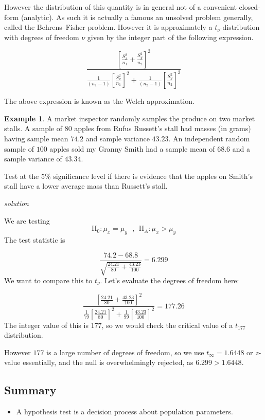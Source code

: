 \documentclass[
]{book}
\providecommand{\tightlist}{%
  \setlength{\itemsep}{0pt}\setlength{\parskip}{0pt}}
\theoremstyle{definition}
\theoremstyle{definition}
\newtheorem{example}{Example}[chapter]
\theoremstyle{definition}
\theoremstyle{definition}
\theoremstyle{remark}
\begin{document}
However the distribution of this quantity is in general not of a convenient closed-form (analytic). As such it is actually a famous an unsolved problem generally, called the Behrens--Fisher problem. However it is approximately a \(t_\nu\)-distribution with degrees of freedom \(\nu\) given by the integer part of the following expression.

\[\frac{\left[\frac{S^2_x}{n_1}+\frac{S^2_y}{n_2} \right]^2}{\frac{1}{(n_1-1)}\left[\frac{S_x^2}{n_1}\right]^2+\frac{1}{(n_2-1)}\left[\frac{S_y^2}{n_2}\right]^2} \]

The above expression is known as the Welch approximation.

\begin{example}
A market inspector randomly samples the produce on two market stalls. A sample of \(80\) apples from Rufus Russett's stall had masses (in grams) having sample mean \(74.2\) and sample variance \(43.23\).
An independent random sample of \(100\) apples sold my Granny Smith had a sample mean of \(68.6\) and a sample variance of \(43.34\).

Test at the \(5\%\) significance level if there is evidence that the apples on Smith's stall have a lower average mass than Russett's stall.
\end{example}

\emph{solution}

We are testing
\[\text{H}_0: \mu_x = \mu_y \ \ \ , \ \ \text{H}_A:\mu_x>\mu_y\]
The test statistic is

\[ \frac{74.2 - 68.8}{\sqrt{\frac{24.21}{80}+\frac{43.23}{100}}} = 6.299\]
We want to compare this to \(t_\nu\). Let's evaluate the degrees of freedom here:

\[\frac{\left[\frac{24.21}{80}+\frac{43.23}{100} \right]^2}{\frac{1}{79}\left[\frac{24.21}{80}\right]^2+\frac{1}{99}\left[\frac{43.23}{100}\right]^2} = 177.26 \]
The integer value of this is \(177\), so we would check the critical value of a \(t_177\) distribution.

However \(177\) is a large number of degrees of freedom, so we use \(t_{\infty}=1.6448\) or \(z\)-value essentially, and the null is overwhelmingly rejected, as \(6.299 >1.6448\).

\hypertarget{summary}{%
\subsection{Summary}\label{summary}}

\begin{itemize}
\tightlist
\item
  A hypothesis test is a decision process about population parameters.
\end{itemize}
\end{document}
